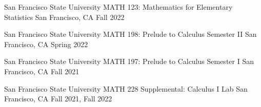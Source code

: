 \documentclass[../omelveny-cv]{subfiles}
\begin{document}


\begin{cventries}

    \cventry
    {San Francisco State University} %
    {MATH 123:  Mathematics for Elementary Statistics} %
    {San Francisco, CA} %
    {Fall 2022} %
    {}

    \vspace{-0.75em}

    \cventry
    {San Francisco State University} %
    {MATH 198: Prelude to Calculus Semester II} %
    {San Francisco, CA} %
    {Spring 2022} %
    {}

    \vspace{-0.75em}

    \cventry
    {San Francisco State University} %
    {MATH 197: Prelude to Calculus Semester I} %
    {San Francisco, CA} %
    {Fall 2021} %
    {}

    \vspace{-0.75em}

    \cventry
    {San Francisco State University} %
    {MATH 228 Supplemental: Calculus I Lab} %
    {San Francisco, CA} %
    {Fall 2021, Fall 2022} %
    {}

\end{cventries}
\end{document}
